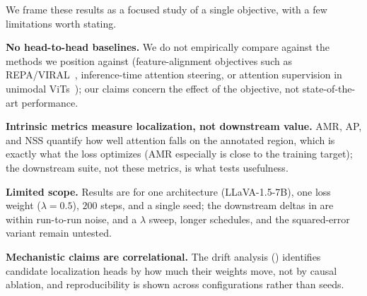We frame these results as a focused study of a single objective, with a few limitations worth stating.

\textbf{No head-to-head baselines.} We do not empirically compare against the methods we position against (feature-alignment objectives such as REPA/VIRAL~\citep{yurepresentation, yoon2025visual}, inference-time attention steering, or attention supervision in unimodal ViTs~\citep{chefer2022optimizing}); our claims concern the effect of the objective, not state-of-the-art performance.

\textbf{Intrinsic metrics measure localization, not downstream value.} AMR, AP, and NSS quantify how well attention falls on the annotated region, which is exactly what the loss optimizes (AMR especially is close to the training target); the downstream suite, not these metrics, is what tests usefulness.

\textbf{Limited scope.} Results are for one architecture (LLaVA-1.5-7B), one loss weight ($\lambda{=}0.5$), $200$ steps, and a single seed; the downstream deltas in  are within run-to-run noise, and a $\lambda$ sweep, longer schedules, and the squared-error variant remain untested.

\textbf{Mechanistic claims are correlational.} The drift analysis () identifies candidate localization heads by how much their weights move, not by causal ablation, and reproducibility is shown across configurations rather than seeds.
